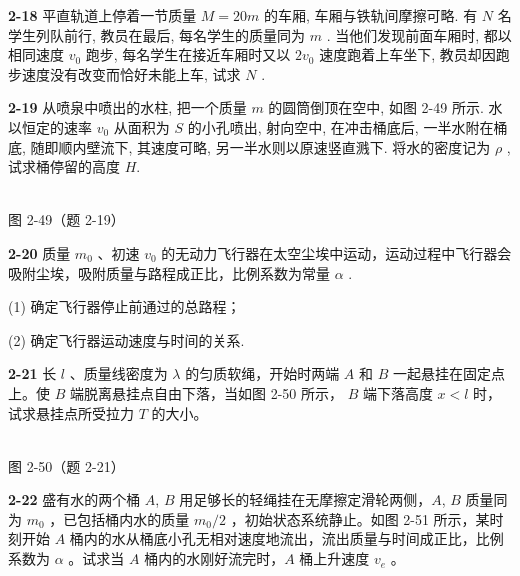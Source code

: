 \newpage

\textbf{2-18} 平直轨道上停着一节质量 $M = 20m$ 的车厢, 车厢与铁轨间摩擦可略. 有 $N$ 名学生列队前行, 教员在最后, 每名学生的质量同为 $m$ . 当他们发现前面车厢时, 都以相同速度 $v_{0}$ 跑步, 每名学生在接近车厢时又以 $2v_{0}$ 速度跑着上车坐下, 教员却因跑步速度没有改变而恰好未能上车, 试求 $N$ .

\newpage

\textbf{2-19} 从喷泉中喷出的水柱, 把一个质量 $m$ 的圆筒倒顶在空中, 如图 2-49 所示. 水以恒定的速率 $v_{0}$ 从面积为 $S$ 的小孔喷出, 射向空中, 在冲击桶底后, 一半水附在桶底, 随即顺内壁流下, 其速度可略, 另一半水则以原速竖直溅下. 将水的密度记为 $\rho$ , 试求桶停留的高度 $H$.

\begin{center}
\resizebox{0.36\textwidth}{!}{}\\[4pt]
{\small 图 2-49（题 2-19）}
\end{center}

\newpage

\textbf{2-20} 质量 $m_{0}$ 、初速 $v_{0}$ 的无动力飞行器在太空尘埃中运动，运动过程中飞行器会吸附尘埃，吸附质量与路程成正比，比例系数为常量 $\alpha$ .

(1) 确定飞行器停止前通过的总路程；

(2) 确定飞行器运动速度与时间的关系.

\newpage

\textbf{2-21} 长 $l$ 、质量线密度为 $\lambda$ 的匀质软绳，开始时两端 $A$ 和 $B$ 一起悬挂在固定点上。使 $B$ 端脱离悬挂点自由下落，当如图 2-50 所示， $B$ 端下落高度 $x < l$ 时，试求悬挂点所受拉力 $T$ 的大小。

\begin{center}
\resizebox{0.34\textwidth}{!}{}\\[4pt]
{\small 图 2-50（题 2-21）}
\end{center}

\newpage

\textbf{2-22} 盛有水的两个桶 $A$, $B$ 用足够长的轻绳挂在无摩擦定滑轮两侧，$A$, $B$ 质量同为 $m_{0}$ ，已包括桶内水的质量 $m_{0}/2$ ，初始状态系统静止。如图 2-51 所示，某时刻开始 $A$ 桶内的水从桶底小孔无相对速度地流出，流出质量与时间成正比，比例系数为 $\alpha$ 。试求当 $A$ 桶内的水刚好流完时，$A$ 桶上升速度 $v_{e}$ 。

